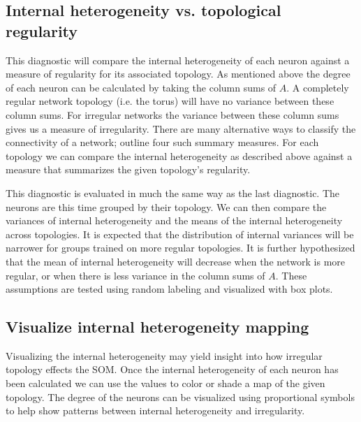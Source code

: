 \subsection{Internal heterogeneity vs. topological regularity}
This diagnostic will compare the internal heterogeneity of each neuron against a
measure of regularity for its associated topology.  As mentioned above the
degree of each neuron can be calculated by taking the column sums of $A$.  A
completely regular network topology (i.e. the torus) will have no variance
between these column sums.  For irregular networks the variance between these
column sums gives us a measure of irregularity. There are many alternative
ways to classify the connectivity of a network; \cite{florax95} outline four
such summary measures.  For each topology we can compare the internal
heterogeneity as described above against a measure that summarizes the given
topology's regularity.

This diagnostic is evaluated in much the same way as the last diagnostic.  
The neurons are this time grouped by their topology.  We can then
compare the variances of internal heterogeneity and the means of the internal
heterogeneity across topologies.  It is expected that the distribution of internal
variances will be narrower for groups trained on more regular topologies.
It is further hypothesized that the mean of internal heterogeneity will
decrease when the network is more regular, or when there is less variance in
the column sums of $A$.  These assumptions are tested using random labeling
and visualized with box plots.

\subsection{Visualize internal heterogeneity mapping}
Visualizing the internal heterogeneity may yield insight into how irregular topology
effects the SOM.  Once the internal heterogeneity of each neuron has been calculated
we can use the values to color or shade a map of the given topology.  
The degree of the neurons can be visualized using proportional symbols to help show patterns between internal heterogeneity and irregularity.

